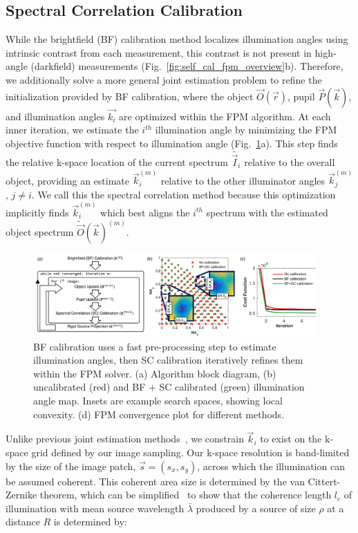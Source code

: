 \subsection{Spectral Correlation Calibration}
While the brightfield (BF) calibration method localizes illumination angles using intrinsic contrast from each measurement, this contrast is not present in high-angle (darkfield) measurements (Fig.~\ref{fig:self_cal_fpm_overview}b). Therefore, we additionally solve a more general joint estimation problem to refine the initialization provided by BF calibration, where the object $\vec{O}(\vec{r})$, pupil $\vec{P}(\vec{k})$, and illumination angles $\vec{k_i}$ are optimized within the FPM algorithm. At each inner iteration, we estimate the $i^{th}$ illumination angle by minimizing the FPM objective function with respect to illumination angle (Fig.~\ref{fig:DF_calibration}a). This step finds the relative k-space location of the current spectrum $\tilde{\vec{I}_i}$ relative to the overall object, providing an estimate $\vec{k}_i^{(m)}$ relative to the other illuminator angles $\vec{k}^{(m)}_j$, $j\neq i$. We call this the spectral correlation method because this optimization implicitly finds $\vec{k}_i^{(m)}$ which best aligns the $i^{th}$ spectrum with the estimated object spectrum $\tilde{\vec{O}}(\vec{k})^{(m)}$.

\begin{figure}[hbt]
	\centering
	\includegraphics[width=0.97\textwidth]{figures/fig_selfcal_fpm_df.pdf}
	\caption{BF calibration uses a fast pre-processing step to estimate illumination angles, then SC calibration iteratively refines them within the FPM solver. (a) Algorithm block diagram, (b) uncalibrated (red) and BF + SC calibrated (green) illumination angle map. Insets are example search spaces, showing local convexity. (d) FPM convergence plot for different methods.
		}
	\label{fig:DF_calibration}
\end{figure}

Unlike previous joint estimation methods~\cite{Yeh2015,Sun:16LEDpos}, we constrain $\vec{k}_i$ to exist on the k-space grid defined by our image sampling. Our k-space resolution is band-limited by the size of the image patch, $\vec{s}=(s_x,s_y)$, across which the illumination can be assumed coherent. This coherent area size is determined by the van Cittert-Zernike theorem, which can be simplified~\cite{BornWolf} to show that the coherence length $l_c$ of illumination with mean source wavelength $\bar{\lambda}$ produced by a source of size $\rho$ at a distance $R$ is determined by:

